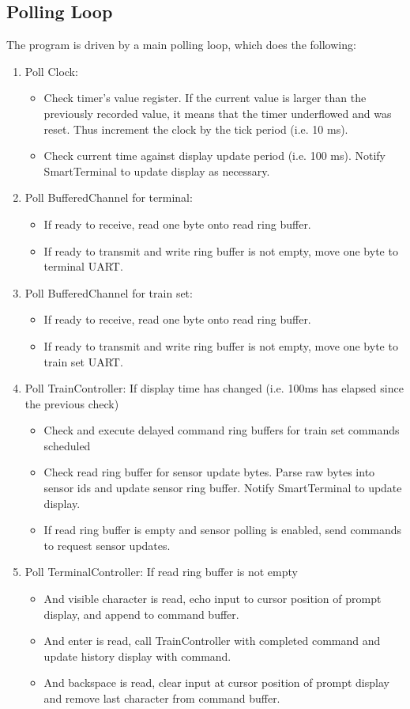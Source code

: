 \documentclass[11pt]{article}
\begin{document}
\subsection{Polling Loop}
The program is driven by a main polling loop, which does the following:
\begin{enumerate}
	\item Poll Clock: \begin{itemize}
		\item Check timer's value register. If the current value is larger than the previously recorded value, it means that the timer underflowed and was reset. Thus increment the clock by the tick period (i.e. 10 ms).
		\item Check current time against display update period (i.e. 100 ms). Notify SmartTerminal to update display as necessary. 
	\end{itemize}
	\item Poll BufferedChannel for terminal: \begin{itemize}
		\item If ready to receive, read one byte onto read ring buffer.
		\item If ready to transmit and write ring buffer is not empty, move one byte to terminal UART.
	\end{itemize} 
	\item Poll BufferedChannel for train set: \begin{itemize}
		\item If ready to receive, read one byte onto read ring buffer.
		\item If ready to transmit and write ring buffer is not empty, move one byte to train set UART.
	\end{itemize}
	\item Poll TrainController: If display time has changed (i.e. 100ms has elapsed since the previous check) \begin{itemize}
		\item Check and execute delayed command ring buffers for train set commands scheduled
		\item Check read ring buffer for sensor update bytes. Parse raw bytes into sensor ids and update sensor ring buffer. Notify SmartTerminal to update display.
		\item If read ring buffer is empty and sensor polling is enabled, send commands to request sensor updates.
	\end{itemize}
	\item Poll TerminalController: If read ring buffer is not empty \begin{itemize}
		\item And visible character is read, echo input to cursor position of prompt display, and append to command buffer.
		\item And enter is read, call TrainController with completed command and update history display with command.
		\item And backspace is read, clear input at cursor position of prompt display and remove last character from command buffer.
	\end{itemize}
\end{enumerate}
\end{document}
